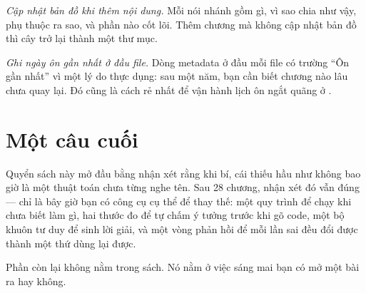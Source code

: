 \documentclass[algorithm.tex]{subfiles}
\begin{document}
\emph{Cập nhật bản đồ khi thêm nội dung.} Mỗi  nói nhánh gồm gì, vì sao chia như vậy, phụ thuộc ra sao, và phần nào cốt lõi. Thêm chương mà không cập nhật bản đồ thì cây trở lại thành một thư mục.

\emph{Ghi ngày ôn gần nhất ở đầu file.} Dòng metadata ở đầu mỗi file có trường ``Ôn gần nhất'' vì một lý do thực dụng: sau một năm, bạn cần biết chương nào lâu chưa quay lại. Đó cũng là cách rẻ nhất để vận hành lịch ôn ngắt quãng ở .

\section*{Một câu cuối}

Quyển sách này mở đầu bằng nhận xét rằng khi bí, cái thiếu hầu như không bao giờ là một thuật toán chưa từng nghe tên. Sau 28 chương, nhận xét đó vẫn đúng --- chỉ là bây giờ bạn có công cụ cụ thể để thay thế: một quy trình để chạy khi chưa biết làm gì, hai thước đo để tự chấm ý tưởng trước khi gõ code, một bộ khuôn tư duy để sinh lời giải, và một vòng phản hồi để mỗi lần sai đều đổi được thành một thứ dùng lại được.

Phần còn lại không nằm trong sách. Nó nằm ở việc sáng mai bạn có mở một bài ra hay không.
\end{document}
